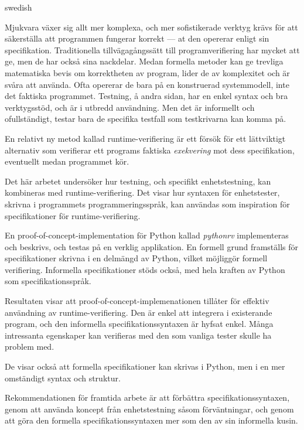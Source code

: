 \documentclass[a4paper,11pt]{kth-mag}
\theoremstyle{definition}
\begin{document}
\begin{foreignabstract}{swedish}

Mjukvara växer sig allt mer komplexa, och mer sofistikerade verktyg
krävs för att säkerställa att programmen fungerar korrekt --- at den opererar
enligt sin specifikation. Traditionella tillvägagångssätt till
programverifiering har mycket att ge, men de har också sina nackdelar. Medan
formella metoder kan ge trevliga matematiska bevis om korrektheten av program,
lider de av komplexitet och är svåra att använda. Ofta opererar de bara på en
konstruerad systemmodell, inte det faktiska programmet. Testning, å andra
sidan, har en enkel syntax och bra verktygsstöd, och är i utbredd användning.
Men det är informellt och ofullständigt, testar bara de specifika testfall som
testkrivarna kan komma på.

En relativt ny metod kallad runtime-verifiering är ett försök för ett
lättviktigt alternativ som verifierar ett programs faktiska \textit{exekvering}
mot dess specifikation, eventuellt medan programmet kör.

Det här arbetet undersöker hur testning, och specifikt enhetstestning, kan
kombineras med runtime-verifiering. Det visar hur syntaxen för enhetstester,
skrivna i programmets programmeringsspråk, kan användas som inspiration för
specifikationer för runtime-verifiering.

En proof-of-concept-implementation för Python kallad \textit{pythonrv}
implementeras och beskrivs, och testas på en verklig applikation. En formell
grund framställs för specifikationer skrivna i en delmängd av Python, vilket
möjliggör formell verifiering. Informella specifikationer stöds också, med hela
kraften av Python som specifikationsspråk.

Resultaten visar att proof-of-concept-implemenationen tillåter för effektiv
användning av runtime-verifiering. Den är enkel att integrera i existerande
program, och den informella specifikationssyntaxen är hyfsat enkel. Många
intressanta egenskaper kan verifieras med den som vanliga tester skulle ha
problem med.

De visar också att formella specifikationer kan skrivas i Python, men i en mer
omständigt syntax och struktur.

Rekommendationen för framtida arbete är att förbättra specifikationssyntaxen,
genom att använda koncept från enhetstestning såsom förväntningar, och genom
att göra den formella specifikationssyntaxen mer som den av sin informella
kusin.

\end{foreignabstract}
\clearpage
\end{document}
